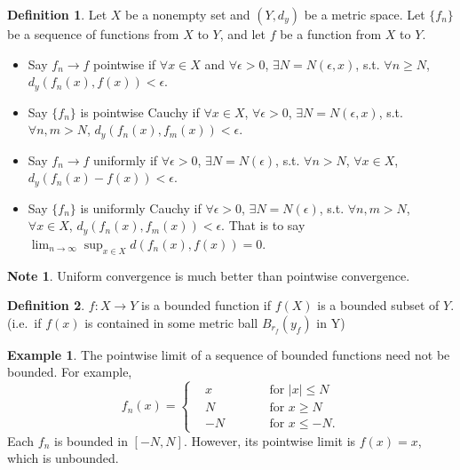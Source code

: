 \documentclass[12pt]{article}
\theoremstyle{plain}
\theoremstyle{definition}
\newtheorem*{defn}{Definition}
\newtheorem*{eg}{Example}
\newtheorem*{note}{Note}
\begin{document}
\begin{defn}
    Let $X$ be a nonempty set and $(Y,d_y)$ be a metric space.
    Let $\{f_n\}$ be a sequence of functions from $X$ to $Y$, and let $f$ be a
    function from $X$ to $Y$.
    \begin{itemize}
        \item
            Say $f_n\rightarrow f$ pointwise if $\forall x\in X$ and $\forall
            \epsilon>0$, $\exists N=N(\epsilon,x)$, s.t.
            $\forall n\geq N$, $d_y(f_n(x),f(x))<\epsilon$.
        \item
            Say $\{f_n\}$ is pointwise Cauchy if $\forall x\in X$, $\forall
            \epsilon>0$, $\exists N=N(\epsilon,x)$, s.t. $\forall n,m>N$, 
            $d_y(f_n(x),f_m(x))<\epsilon$.
        \item
            Say $f_n\rightarrow f$ uniformly if $\forall \epsilon>0$, $\exists
            N=N(\epsilon)$, s.t. $\forall n>N$, $\forall x\in X$,
            $d_y(f_n(x)-f(x))<\epsilon$.
        \item
            Say $\{f_n\}$ is uniformly Cauchy if $\forall \epsilon>0$, $\exists
            N=N(\epsilon)$, s.t. $\forall n,m>N$, $\forall x\in X$, $d_y(f_n(x),
            f_m(x))<\epsilon$. That is to say
            $\lim_{n\rightarrow\infty}\sup_{x\in X}d(f_n(x),f(x))=0$.
    \end{itemize}
\end{defn}

\begin{note}
    Uniform convergence is much better than pointwise convergence.
\end{note}

\begin{defn}
    $f: X\rightarrow Y$ is a bounded function if $f(X)$ is a bounded subset of
    $Y$. (i.e.\ if $f(x)$ is contained in some metric ball $B_{r_f}(y_f)$ in Y)
\end{defn}

\begin{eg}
    The pointwise limit of a sequence of bounded functions need not be bounded.
    For example,
    $$f_n(x)=\left\{
        \begin{aligned}
            &x&&\text{for }|x|\leq N\\
            &N &&\text{for }x\geq N\\
            &-N\qquad&&\text{for }x\leq-N.
        \end{aligned}
    \right.$$
    Each $f_n$ is bounded in $[-N,N]$. However, its pointwise limit is $f(x)=x$,
    which is unbounded.
\end{eg}
\end{document}
